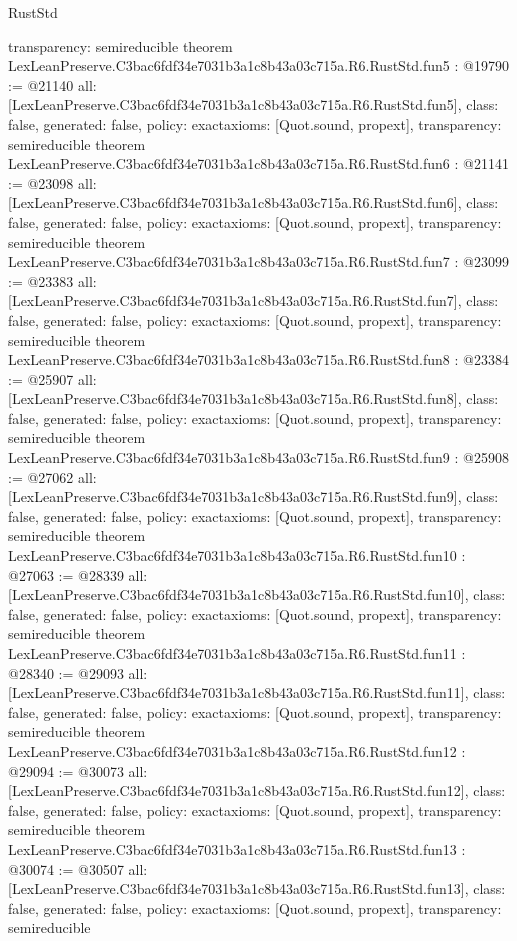 \begin{lexlean}{RustStd}
\begin{coremodule}
{  transparency: semireducible
}
theorem LexLeanPreserve.C3bac6fdf34e7031b3a1c8b43a03c715a.R6.RustStd.fun5 : @19790 := @21140 {
  all: [LexLeanPreserve.C3bac6fdf34e7031b3a1c8b43a03c715a.R6.RustStd.fun5],
  class: false,
  generated: false,
  policy: exact{axioms: [Quot.sound, propext]},
  transparency: semireducible
}
theorem LexLeanPreserve.C3bac6fdf34e7031b3a1c8b43a03c715a.R6.RustStd.fun6 : @21141 := @23098 {
  all: [LexLeanPreserve.C3bac6fdf34e7031b3a1c8b43a03c715a.R6.RustStd.fun6],
  class: false,
  generated: false,
  policy: exact{axioms: [Quot.sound, propext]},
  transparency: semireducible
}
theorem LexLeanPreserve.C3bac6fdf34e7031b3a1c8b43a03c715a.R6.RustStd.fun7 : @23099 := @23383 {
  all: [LexLeanPreserve.C3bac6fdf34e7031b3a1c8b43a03c715a.R6.RustStd.fun7],
  class: false,
  generated: false,
  policy: exact{axioms: [Quot.sound, propext]},
  transparency: semireducible
}
theorem LexLeanPreserve.C3bac6fdf34e7031b3a1c8b43a03c715a.R6.RustStd.fun8 : @23384 := @25907 {
  all: [LexLeanPreserve.C3bac6fdf34e7031b3a1c8b43a03c715a.R6.RustStd.fun8],
  class: false,
  generated: false,
  policy: exact{axioms: [Quot.sound, propext]},
  transparency: semireducible
}
theorem LexLeanPreserve.C3bac6fdf34e7031b3a1c8b43a03c715a.R6.RustStd.fun9 : @25908 := @27062 {
  all: [LexLeanPreserve.C3bac6fdf34e7031b3a1c8b43a03c715a.R6.RustStd.fun9],
  class: false,
  generated: false,
  policy: exact{axioms: [Quot.sound, propext]},
  transparency: semireducible
}
theorem LexLeanPreserve.C3bac6fdf34e7031b3a1c8b43a03c715a.R6.RustStd.fun10 : @27063 := @28339 {
  all: [LexLeanPreserve.C3bac6fdf34e7031b3a1c8b43a03c715a.R6.RustStd.fun10],
  class: false,
  generated: false,
  policy: exact{axioms: [Quot.sound, propext]},
  transparency: semireducible
}
theorem LexLeanPreserve.C3bac6fdf34e7031b3a1c8b43a03c715a.R6.RustStd.fun11 : @28340 := @29093 {
  all: [LexLeanPreserve.C3bac6fdf34e7031b3a1c8b43a03c715a.R6.RustStd.fun11],
  class: false,
  generated: false,
  policy: exact{axioms: [Quot.sound, propext]},
  transparency: semireducible
}
theorem LexLeanPreserve.C3bac6fdf34e7031b3a1c8b43a03c715a.R6.RustStd.fun12 : @29094 := @30073 {
  all: [LexLeanPreserve.C3bac6fdf34e7031b3a1c8b43a03c715a.R6.RustStd.fun12],
  class: false,
  generated: false,
  policy: exact{axioms: [Quot.sound, propext]},
  transparency: semireducible
}
theorem LexLeanPreserve.C3bac6fdf34e7031b3a1c8b43a03c715a.R6.RustStd.fun13 : @30074 := @30507 {
  all: [LexLeanPreserve.C3bac6fdf34e7031b3a1c8b43a03c715a.R6.RustStd.fun13],
  class: false,
  generated: false,
  policy: exact{axioms: [Quot.sound, propext]},
  transparency: semireducible
}
\end{coremodule}
\end{lexlean}
